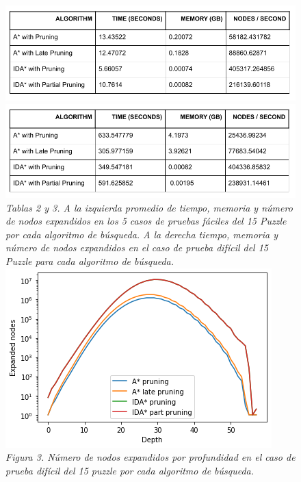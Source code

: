 \documentclass[a4paper,10pt]{article}
\begin{document}
    \begin{figure}[t!]
      \centering
      \includegraphics[scale=0.3]{15puzzle/tabla2.png} 
      \includegraphics[scale=0.3]{15puzzle/tabla3.png} \\
      \textit{\small{Tablas 2 y 3. A la izquierda promedio de tiempo, memoria y n\'umero 
      de nodos expandidos en los 5 casos de pruebas f\'aciles del 15 Puzzle por cada algoritmo 
      de b\'usqueda. A la derecha tiempo, memoria y n\'umero de nodos expandidos en el caso
      de prueba dif\'icil del 15 Puzzle para cada algoritmo de b\'usqueda.}}\\
      \includegraphics[scale=0.4]{15puzzle/15puzzle_hard.png} \\
      \textit{\small{Figura 3. N\'umero de nodos expandidos por profundidad en el caso 
      de prueba dif\'icil del 15 puzzle por cada algoritmo de b\'usqueda.}}
    \end{figure}
    
\end{document}
